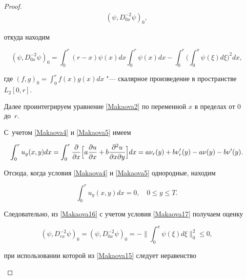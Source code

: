 \begin{proof}
\begin{multline}
(\psi, D^{-2}_{0x}\psi)_0,

\end{multline}

откуда находим

\begin{equation}

\label{Makaova16} 

   (\psi, D^{-2}_{0x}\psi)_0 =

\int _0^r (r-x) \psi(x) d x \int _0^r  \psi(x) dx -

\int _0^r \biggl(\int _0^x  \psi(\xi) d \xi \biggr)^2 dx,

\end{equation}

где $\displaystyle (f,g)_0=\int _0^r f(x) g(x)dx$ "--- скалярное произведение в пространстве $L_2[0,r]$.





Далее проинтегрируем уравнение \eqref{Makaova2} по переменной $x$ в пределах от $0$ до~$r$. 

С~учетом  \eqref{Makaova4} и \eqref{Makaova5} имеем

\[

\int _0^r u_y(x,y) dx=\int _0^r \frac{\partial}{\partial x}

\Bigl[ a\frac{\partial u}{\partial x}+b\frac{\partial^2 u}{\partial x \partial y}\Bigr]dx

=a\nu_r(y)+b\nu_r'(y)-a\nu(y)-b\nu'(y).

\]

Отсюда, когда условия \eqref{Makaova4} и \eqref{Makaova5} однородные, находим

\begin{equation}

\label{Makaova17}

\int _0^r u_y(x,y) dx=0, \quad  0\leq y\leq T.

\end{equation}

Следовательно, из \eqref{Makaova16} с учетом условия \eqref{Makaova17} получаем оценку

\[

\left( \psi, D_{rx}^{-2}\psi \right)_0=\left( \psi, D_{0x}^{-2}\psi \right)_0=-

\biggl\|\int _0^x \psi(\xi) d\xi \biggr\|^2_0 \leq 0,

\]

при использовании которой из \eqref{Makaova15} следует неравенство

\begin{equation}


\end{equation}
\end{proof}
